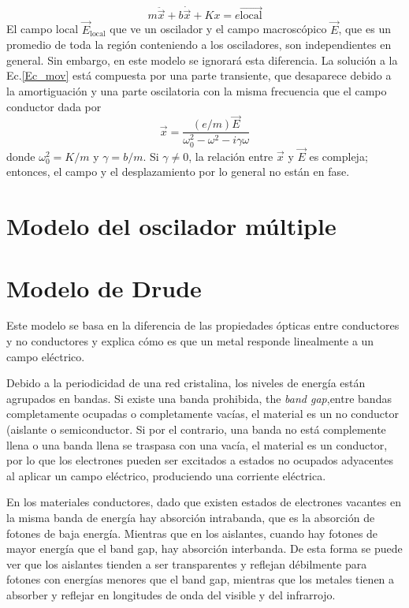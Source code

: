 \documentclass[paper=letter, fontsize=12pt,]{article}
\begin{document}
\begin{equation}
		m\ddot{\Vec{x}}+b\dot{\Vec{x}}+Kx=e\Vec{\mbox{local}}
		\label{Ec_mov}
\end{equation}
El campo local $\Vec{E}_{\mbox{local}}$ que ve un oscilador y el campo macroscópico $\Vec{E}$, que es un promedio de toda la región conteniendo a los osciladores, son independientes en general. Sin embargo, en este modelo se ignorará esta diferencia. La solución a la Ec.\ref{Ec_mov} está compuesta por una parte transiente, que desaparece debido a la amortiguación y una parte oscilatoria con la misma frecuencia que el campo conductor dada por
\begin{equation}
		\Vec{x}=\frac{(e/m)\Vec{E}}{\omega_0^2-\omega^2-i\gamma\omega}
\end{equation} 
donde $\omega_0^2=K/m$ y $\gamma=b/m$. Si $\gamma\neq 0$, la relación entre $\Vec{x}$ y $\Vec{E}$ es compleja; entonces, el campo y el desplazamiento por lo general no están en fase. 




\section{Modelo del oscilador múltiple}

\section{Modelo de Drude}
Este modelo se basa en la diferencia de las propiedades ópticas entre conductores y no conductores y explica cómo es que un metal responde linealmente a un campo eléctrico.


Debido a la periodicidad de una red cristalina, los niveles de energía están agrupados en bandas. Si existe una banda prohibida, the \textit{band gap},entre bandas completamente ocupadas o completamente vacías, el material es un no conductor (aislante o semiconductor. Si por el contrario, una banda no está complemente llena o una banda llena se traspasa con una vacía, el material es un conductor, por lo que los electrones pueden ser excitados a estados no ocupados adyacentes al aplicar un campo eléctrico, produciendo una corriente eléctrica.

En los materiales conductores, dado que existen estados de electrones vacantes en la misma banda de energía hay absorción intrabanda, que es la absorción de fotones de baja energía. Mientras que en los aislantes, cuando hay fotones de mayor energía que el band gap, hay absorción interbanda. De esta forma se puede ver que los aislantes tienden a ser transparentes y reflejan débilmente para fotones con energías menores que el band gap, mientras que los metales tienen a absorber y reflejar en longitudes de onda del visible y del infrarrojo.
\end{document}

